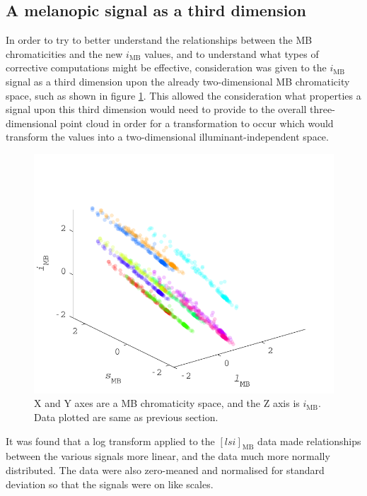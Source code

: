 \subsection{A melanopic signal as a third dimension}

In order to try to better understand the relationships between the \gls{MB} chromaticities and the new $i_{\text{MB}}$ values, and to understand what types of corrective computations might be effective, consideration was given to the $i_{\text{MB}}$ signal as a third dimension upon the already two-dimensional \gls{MB} chromaticity space, such as shown in figure \ref{fig:ZL}. This allowed the consideration what properties a signal upon this third dimension would need to provide to the overall three-dimensional point cloud in order for a transformation to occur which would transform the values into a two-dimensional illuminant-independent space.

\begin{figure}[htbp]
 \includegraphics[max width=\textwidth]{figs/comp/thirdDimension/ZL.pdf}
 \caption{X and Y axes are a \gls{MB} chromaticity space, and the Z axis is $i_{\text{MB}}$. Data plotted are same as previous section.}
 \label{fig:ZL}
\end{figure}

It was found that a log transform applied to the $[lsi]_{\text{MB}}$ data made relationships between the various signals more linear, and the data much more normally distributed. The data were also zero-meaned and normalised for standard deviation so that the signals were on like scales.

